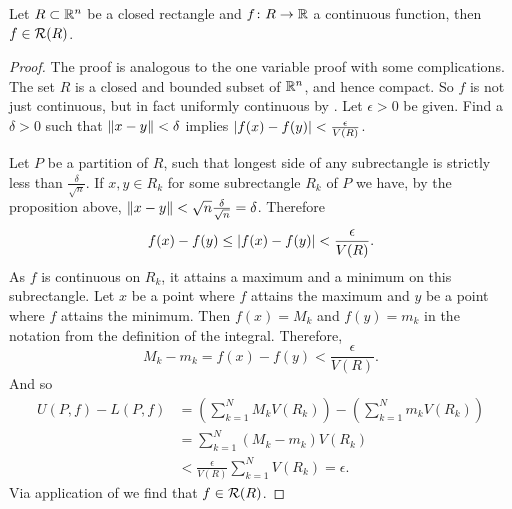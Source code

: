 \begin{thm} \label{mv:thm:contintrect}
Let $R \subset {\mathbb{R}}^n$ be a closed rectangle and
$f \colon R \to {\mathbb{R}}$ a continuous function,
then $f \in {\mathcal{R}}(R)$.
\end{thm}

\begin{proof}
The proof is analogous to the one variable proof with some complications.
The set $R$ is a closed and bounded subset of ${\mathbb{R}}^n$, and hence compact.  So
$f$ is not just continuous, but in fact uniformly continuous 
by .
Let $\epsilon > 0$ be given.  Find a $\delta > 0$ such that
$\lVert {x-y} \rVert < \delta$ implies $\lvert {f(x)-f(y)} \rvert < \frac{\epsilon}{V(R)}$.

Let $P$ be a partition of $R$, such that longest side of any subrectangle
is strictly less than $\frac{\delta}{\sqrt{n}}$.
If $x, y \in R_k$ for some subrectangle $R_k$ of $P$ we have,
by the proposition above,
$\lVert {x-y} \rVert < \sqrt{n} \frac{\delta}{\sqrt{n}} = \delta$.  Therefore
\begin{equation*}
f(x)-f(y) \leq \lvert {f(x)-f(y)} \rvert < \frac{\epsilon}{V(R)} .
\end{equation*}
As $f$ is continuous on $R_k$, it attains a maximum and a minimum
on this subrectangle.
Let $x$ be a point where $f$ attains the maximum and $y$ be a point
where $f$ attains the minimum.  Then $f(x) = M_k$
and $f(y) = m_k$ in the notation from the definition of the integral.
Therefore,
\begin{equation*}
M_k-m_k = f(x)-f(y) < 
\frac{\epsilon}{V(R)} .
\end{equation*}
And so
\begin{equation*}
\begin{split}
U(P,f) - L(P,f)
& =
\left(
\sum_{k=1}^N
M_k V(R_k)
\right)
-
\left(
\sum_{k=1}^N
m_k V(R_k)
\right)
\\
& =
\sum_{k=1}^N
(M_k-m_k) V(R_k)
\\
& <
\frac{\epsilon}{V(R)}
\sum_{k=1}^N
V(R_k)
= \epsilon.
\end{split}
\end{equation*}
Via application of  we find that $f \in
{\mathcal{R}}(R)$.
\end{proof}

